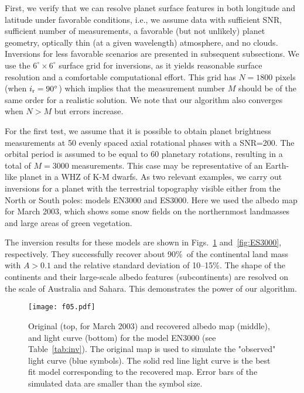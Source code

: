 \documentclass{emulateapj}
\begin{document}
First, we verify that we can resolve planet surface features in both longitude 
and latitude under favorable conditions, i.e., we assume data with sufficient SNR,
sufficient number of measurements, a favorable (but not unlikely) planet geometry,
optically thin (at a given wavelength) atmosphere, and no clouds.
Inversions for  less favorable scenarios are presented in subsequent subsections.
We use the $6^\circ\times6^\circ$ surface grid for inversions, as it yields
reasonable surface resolution and a comfortable computational effort. This grid has  $N=1800$ 
pixels (when $i_{\rm r}=90^\circ$) which implies that the measurement number $M$ should be
of the same order for a realistic solution. We note that our algorithm also converges 
when $N>M$ but errors increase.

For the first test, we assume that it is possible to obtain planet brightness 
measurements at 50 evenly spaced axial rotational phases with a SNR=200.
The orbital period is assumed to be equal to 60 planetary rotations, resulting
in a total of $M=3000$ measurements.
This case may be representative of an Earth-like planet 
in a WHZ of K-M dwarfs.
As two relevant examples, we carry out inversions for a planet with the terrestrial 
topography visible either from the North or South poles: models EN3000 and ES3000. 
Here we used the albedo map for March 2003, which shows some snow fields 
on the northernmost landmasses and large areas of green vegetation.
 
The inversion results for these
models are shown in Figs.~\ref{fig:EN3000} and~\ref{fig:ES3000}, respectively.
They successfully recover about 90\%\ of the continental land mass with
$A>0.1$ and the relative standard deviation of 10--15\%.
The shape of the continents and their large-scale albedo features (subcontinents) are
resolved on the scale of Australia and Sahara.
This demonstrates the power of our algorithm.

\begin{figure}
\centering
\texttt{[image: f05.pdf]}
\caption{Original (top, for March 2003) and recovered albedo map (middle), 
and light curve (bottom) for the model EN3000 (see Table~\ref{tab:inv}). 
The original map is used to simulate the "observed" light curve (blue symbols).
The solid red line light curve is the best fit model corresponding to the recovered
map. Error bars of the simulated data are smaller than the symbol size. }
\label{fig:EN3000}
\end{figure}
\end{document}
